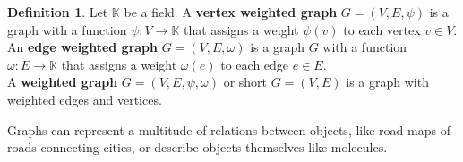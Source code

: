 \documentclass{article}
\theoremstyle{definition}
\newtheorem{definition}[theorem]{Definition}
\begin{document}
\begin{definition}
Let $\mathbb{K}$ be a field. A \textbf{vertex weighted graph} $G = (V, E, \psi)$ is a graph with a function $\psi : V \to \mathbb{K}$ that assigns a weight $\psi(v)$ to each vertex $v \in V$. An \textbf{edge weighted graph} $G = (V, E, \omega)$ is a graph $G$ with a function $\omega : E \to \mathbb{K}$ that assigns a weight $\omega(e)$ to each edge $e \in E$. \\
A \textbf{weighted graph} $G = (V, E, \psi, \omega)$ or short $G = (V, E)$ is a graph with weighted edges and vertices.
\end{definition}


Graphs can represent a multitude of relations between objects, like road maps of roads connecting cities, or describe objects themselves like molecules.
\end{document}
